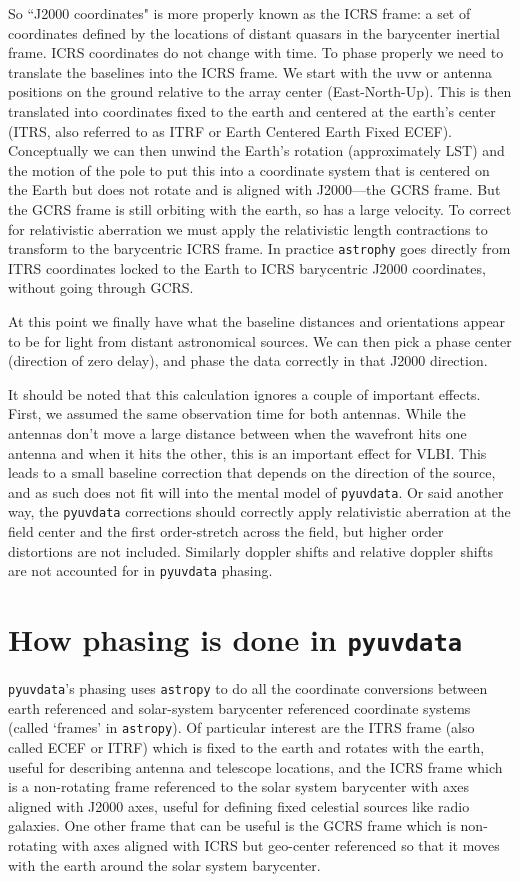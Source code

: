 \documentclass[11pt, oneside]{article}   	%
\begin{document}
So ``J2000 coordinates" is more properly known as the ICRS frame:  a set of coordinates defined by the locations of distant quasars in the barycenter inertial frame. ICRS coordinates do not change with time. To phase properly we need to translate the baselines into the ICRS frame. We start with the uvw or antenna positions on the ground relative to the array center (East-North-Up). This is then translated into coordinates fixed to the earth and centered at the earth's center (ITRS, also referred to as ITRF or Earth Centered Earth Fixed ECEF). Conceptually we can then unwind the Earth's rotation (approximately LST) and the motion of the pole to put this into a coordinate system that is centered on the Earth but does not rotate and is aligned with J2000---the GCRS frame. But the GCRS frame is still orbiting with the earth, so has a large velocity. To correct for relativistic aberration we must apply the relativistic length contractions to transform to the barycentric ICRS frame. In practice \texttt{astrophy} goes directly from ITRS coordinates locked to the Earth to ICRS barycentric J2000 coordinates, without going through GCRS.

At this point we finally have what the baseline distances and orientations appear to be for light from distant astronomical sources. We can then pick a phase center (direction of zero delay), and phase the data correctly in that J2000 direction.

It should be noted that this calculation ignores a couple of important effects. First, we assumed the same observation time for both antennas. While the antennas don't move a large distance between when the wavefront hits one antenna and when it hits the other, this is an important effect for VLBI. This leads to a small baseline correction that depends on the direction of the source, and as such does not fit will into the mental model of \texttt{pyuvdata}. Or said another way, the \texttt{pyuvdata} corrections should correctly apply relativistic aberration at the field center and the first order-stretch across the field, but higher order distortions are not included. Similarly doppler shifts and relative doppler shifts are not accounted for in \texttt{pyuvdata} phasing.



\section{How phasing is done in \texttt{pyuvdata}}
\texttt{pyuvdata}'s phasing uses \texttt{astropy} to do all the coordinate conversions between earth referenced and solar-system barycenter referenced coordinate systems (called `frames' in \texttt{astropy}). Of particular interest are the ITRS frame (also called ECEF or ITRF) which is fixed to the earth and rotates with the earth, useful for describing antenna and telescope locations, and the ICRS frame which is a non-rotating frame referenced to the solar system barycenter with axes aligned with J2000 axes, useful for defining fixed celestial sources like radio galaxies. One other frame that can be useful is the GCRS frame which is non-rotating with axes aligned with ICRS but geo-center referenced so that it moves with the earth around the solar system barycenter.
\end{document}
